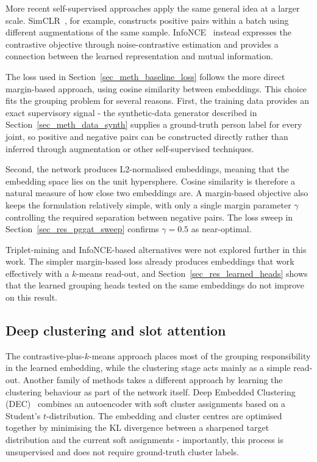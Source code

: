 More recent self-supervised approaches apply the same general idea at a larger scale.
SimCLR~\cite{chen2020simclr}, for example,
constructs positive pairs within a batch using different augmentations of the same sample.
InfoNCE~\cite{oord2018infonce} instead expresses the contrastive objective through noise-contrastive estimation
and provides a connection between the learned representation and mutual information.

The loss used in Section~\ref{sec_meth_baseline_loss} follows the more direct margin-based approach,
using cosine similarity between embeddings.
This choice fits the grouping problem for several reasons.
First, the training data provides an exact supervisory signal -
the synthetic-data generator described in Section~\ref{sec_meth_data_synth}
supplies a ground-truth person label for every joint,
so positive and negative pairs can be constructed directly
rather than inferred through augmentation or other self-supervised techniques.

Second, the network produces L2-normalised embeddings,
meaning that the embedding space lies on the unit hypersphere.
Cosine similarity is therefore a natural measure of how close two embeddings are.
A margin-based objective also keeps the formulation relatively simple,
with only a single margin parameter $\gamma$ controlling the required separation between negative pairs.
The loss sweep in Section~\ref{sec_res_pggat_sweep} confirms $\gamma = 0.5$ as near-optimal.

Triplet-mining and InfoNCE-based alternatives were not explored further in this work.
The simpler margin-based loss already produces embeddings that work effectively with a $k$-means read-out,
and Section~\ref{sec_res_learned_heads} shows
that the learned grouping heads tested on the same embeddings do not improve on this result.

\subsection{Deep clustering and slot attention}
\label{sec_lit_rep_learn_deepcluster}

The contrastive-plus-$k$-means approach places most of the grouping responsibility in the learned embedding,
while the clustering stage acts mainly as a simple read-out.
Another family of methods takes a different approach
by learning the clustering behaviour as part of the network itself.
Deep Embedded Clustering (DEC)~\cite{xie2016dec} combines an autoencoder
with soft cluster assignments based on a Student's $t$-distribution.
The embedding and cluster centres are optimised together
by minimising the KL divergence between a sharpened target distribution and the current soft assignments -
importantly, this process is unsupervised and does not require ground-truth cluster labels.

